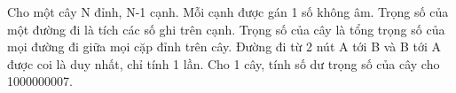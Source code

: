 Cho một cây N đỉnh, N-1 cạnh. Mỗi cạnh được gán 1 số không âm. Trọng số của một đường đi là tích các số ghi trên cạnh. Trọng số của cây là tổng trọng số của mọi đường đi giữa mọi cặp đỉnh trên cây. Đường đi từ 2 nút A tới B và B tới A được coi là duy nhất, chỉ tính 1 lần. Cho 1 cây, tính số dư trọng số của cây cho 1000000007.

\
